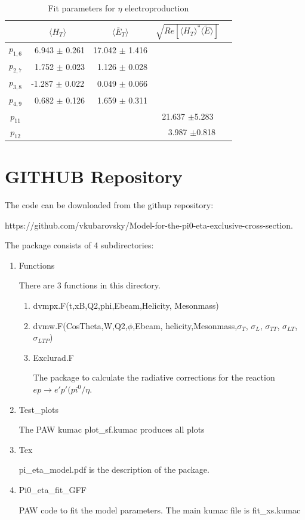 \documentclass[prc,floatfix,superscriptaddress]{revtex4}
\newcommand{\GPDtE}{\langle \tilde{E} \rangle}
\newcommand{\GPDHT}{\langle H_T \rangle}
\newcommand{\ETbar}{\langle \bar{E}_T \rangle}
\begin{document}
\begin{table}[h!]
\caption{Fit parameters for $\eta$ electroproduction}
\begin{tabular}{   | c | c | c |  c | c |}
\hline
                  &  $\GPDHT$                  & $ \ETbar$ &  $\sqrt{Re[\GPDHT^*\GPDtE]}$    \\
\hline
$p_{1,6}$  & \ 6.943 $\pm$ 0.261  & 17.042  $\pm$ 1.416 &    \\
$p_{2,7}$  &\  1.752  $\pm$ 0.023& \ 1.126  $\pm$ 0.028&    \\
$p_{3,8}$   & -1.287  $\pm$ 0.022& \  0.049 $\pm$ 0.066&    \\
$p_{4,9}$  & \  0.682 $\pm$ 0.126 &\  1.659  $\pm$  0.311 &  \\
\hline
$p_{11}$  &   &   &   21.637  $\pm$5.283 \\
$p_{12}$  &   &   & \ \   3.987  $\pm$0.818 \\
\hline
\end{tabular}
\label{Tab:eta_fit_parameters}
\end{table}

\section{GITHUB Repository}

The code can be downloaded from the githup repository:

https://github.com/vkubarovsky/Model-for-the-pi0-eta-exclusive-cross-section.

The package consists of 4 subdirectories:
\begin{enumerate}
\item Functions

There are 3 functions in this directory.
\begin{enumerate}
\item dvmpx.F(t,xB,Q2,phi,Ebeam,Helicity, Mesonmass)
\item dvmw.F(CosTheta,W,Q2,$\phi$,Ebeam, helicity,Mesonmass,$\sigma_{T}$, $\sigma_{L}$, $\sigma_{TT}$, $\sigma_{LT}$, $\sigma_{LTP}$)
\item Exclurad.F

The package to calculate the radiative corrections for the reaction $ep\to e'p'(pi^0/\eta$.
\end{enumerate}
\item Test\_plots

The PAW kumac plot\_sf.kumac produces all plots
\item Tex

pi\_eta\_model.pdf  is the description of the package.
\item Pi0\_eta\_fit\_GFF

PAW code to fit the model parameters. The main kumac file is fit\_xs.kumac
\end{enumerate}
\end{document}
